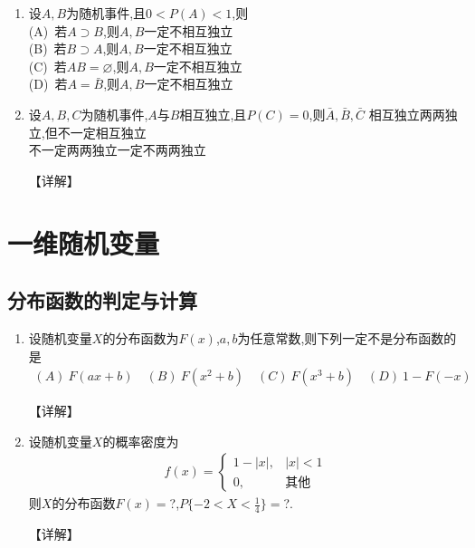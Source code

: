 \documentclass[12pt, a4paper, oneside, UTF8]{ctexbook}
\begin{document}
\begin{enumerate}[label=\arabic*.,start=12]
    \item  设$A,B$为随机事件,且$0<P(A)<1$,则 \\
        (A)\ 若$A\supset B$,则$A,B$一定不相互独立 \\
        (B)\ 若$B\supset A$,则$A,B$一定不相互独立 \\
        (C)\ 若$AB=\varnothing$,则$A,B$一定不相互独立 \\
        (D)\ 若$A=\bar{B}$,则$A,B$一定不相互独立
    
    \begin{solution}
    
    \end{solution}
    
    \item  设$A,B,C$为随机事件,$A$与$B$相互独立,且$P(C)=0$,则$\bar{A},\bar{B},\bar{C}$
    \newline
    相互独立\qquad {}两两独立,但不一定相互独立 \\
    不一定两两独立\qquad {}一定不两两独立
    \begin{solution}
    【详解】
    \end{solution}
\end{enumerate}

\newpage

\section{一维随机变量}

\subsection{分布函数的判定与计算}

\begin{enumerate}[label=\arabic*.]
    \item 设随机变量$X$的分布函数为$F(x)$,$a,b$为任意常数,则下列一定不是分布函数的是
    \begin{align*}
        (A)\ F(ax+b) \quad (B)\ F(x^2+b) \quad (C)\ F(x^3+b) \quad (D)\ 1-F(-x)
    \end{align*}
    
    \begin{solution}
    【详解】
    \end{solution}
    
    \item 设随机变量$X$的概率密度为
    \begin{align*}
        f(x)=\begin{cases}
            1-|x|, & |x|<1 \\
            0, & \text{其他}
        \end{cases}
    \end{align*}
    则$X$的分布函数$F(x)=$?,$P\{-2<X<\frac{1}{4}\}=$?.
    
    \begin{solution}
    【详解】
    \end{solution}
\end{enumerate}
\end{document}
